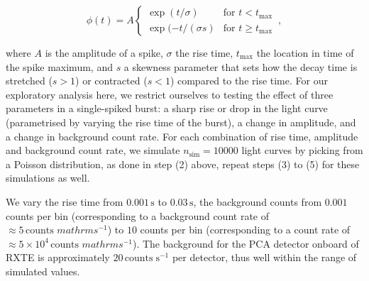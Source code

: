 \documentclass[numberedappendix]{emulateapj}
\begin{document}
\begin{equation}
\phi(t) = A \left\{\begin{array}{ll}\exp(t/\sigma) & \mbox{for $t<t_\mathrm{max}$}\\ \exp(-t/(\sigma s) & \mbox{for $t\geq t_{\mathrm{max}}$}\end{array}\right. \, ,
\label{eqn:spikemodel}
\end{equation}

where $A$ is the amplitude of a spike, $\sigma$ the rise time, $t_\mathrm{max}$ the location in time of the spike maximum, and $s$ a skewness parameter that sets how the decay time is stretched ($s > 1$) or contracted ($s < 1$) compared to the rise time. 
For our exploratory analysis here, we restrict ourselves to testing the effect of three parameters in a single-spiked burst: a sharp rise or drop in the light curve (parametrised by varying the rise time of the burst), a change in amplitude, and a change in background count rate. For each combination of rise time, amplitude and background count rate, we simulate $n_{\mathrm{sim}} = 10000$  light curves by picking from a Poisson distribution, as done in step (2) above, repeat steps (3) to (5) for these simulations as well. 

We vary the rise time from $0.001 \, \mathrm{s}$ to $0.03 \, \mathrm{s}$, the background counts from $0.001$ counts per bin (corresponding to a background count rate of $\approx 5 \, \mathrm{counts}\, \,mathrm{s}^{-1}$) to $10$ counts per bin (corresponding to a count rate of $\approx 5 \times 10^{4}\, \mathrm{counts}\, \,mathrm{s}^{-1}$). The background for the PCA detector onboard of RXTE is approximately $20\, \mathrm{counts}\; \mathrm{s}^{-1}$ per detector, thus well within the range of simulated values.
\end{document}
